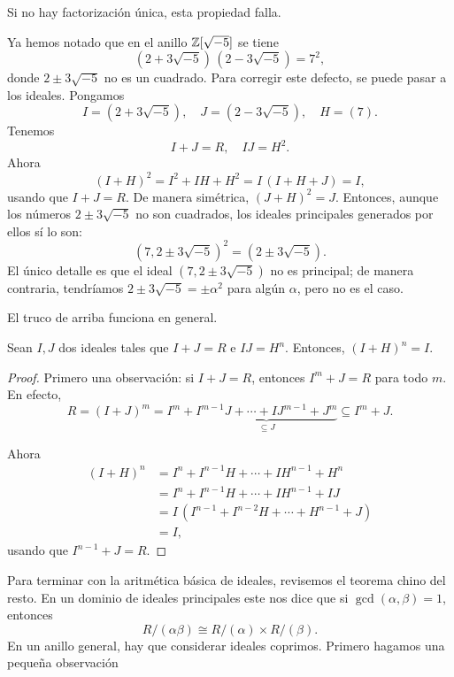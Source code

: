 Si no hay factorización única, esta propiedad falla.

\begin{ejemplo}
  Ya hemos notado que en el anillo $\mathbb{Z} [\sqrt{-5}]$ se tiene
  $$(2 + 3\sqrt{-5})\,(2 - 3\sqrt{-5}) = 7^2,$$
  donde $2 \pm 3\sqrt{-5}$ no es un cuadrado. Para corregir este defecto,
  se puede pasar a los ideales. Pongamos
  \[ I = (2 + 3\sqrt{-5}), \quad J = (2 - 3\sqrt{-5}), \quad H = (7). \]
  Tenemos
  $$I + J = R, \quad I J = H^2.$$
  Ahora
  $$(I + H)^2 = I^2 + I H + H^2 = I\,(I + H + J) = I,$$
  usando que $I + J = R$. De manera simétrica, $(J + H)^2 = J$. Entonces, aunque
  los números $2 \pm 3\sqrt{-5}$ no son cuadrados, los ideales principales
  generados por ellos sí lo son:
  $$(7, 2 \pm 3\sqrt{-5})^2 = (2 \pm 3\sqrt{-5}).$$
  El único detalle es que el ideal $(7, 2 \pm 3\sqrt{-5})$ no es principal;
  de manera contraria, tendríamos $2 \pm 3\sqrt{-5} = \pm\alpha^2$ para algún
  $\alpha$, pero no es el caso.
\end{ejemplo}

El truco de arriba funciona en general.

\begin{proposicion}
  \label{prop:producto-de-ideales-coprimos}
  Sean $I, J$ dos ideales tales que $I + J = R$ e $I J = H^n$.
  Entonces, $(I + H)^n = I$.

  \begin{proof}
    Primero una observación: si $I + J = R$, entonces $I^m + J = R$ para todo
    $m$. En efecto,
    \[ R = (I + J)^m =
       I^m + \underbrace{I^{m-1} J + \cdots + I J^{m-1} + J^m}_{\subseteq J}
       \subseteq I^m + J. \]

    Ahora
    \begin{align*}
      (I + H)^n & = I^n + I^{n-1} H + \cdots + I H^{n-1} + H^n \\
                & = I^n + I^{n-1} H + \cdots + I H^{n-1} + I J \\
                & = I\,(I^{n-1} + I^{n-2} H + \cdots + H^{n-1} + J) \\
                & = I,
    \end{align*}
    usando que $I^{n-1} + J = R$.
    \end{proof}
\end{proposicion}

Para terminar con la aritmética básica de ideales, revisemos el teorema chino
del resto. En un dominio de ideales principales este nos dice que
si $\gcd (\alpha,\beta) = 1$, entonces
$$R/(\alpha\beta) \cong R/(\alpha) \times R/(\beta).$$
En un anillo general, hay que considerar ideales coprimos. Primero hagamos
una pequeña observación


